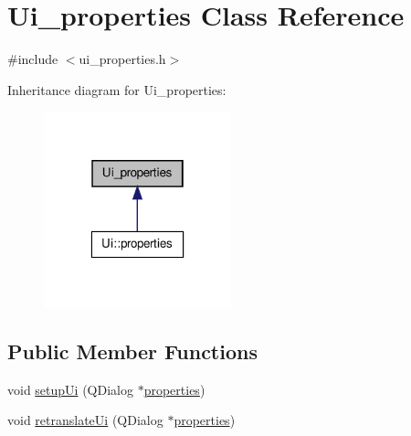 \hypertarget{classUi__properties}{
\section{Ui\_\-properties Class Reference}
\label{classUi__properties}
}


{\ttfamily \#include $<$ui\_\-properties.h$>$}



Inheritance diagram for Ui\_\-properties:
\nopagebreak
\begin{figure}[H]
\begin{center}
\leavevmode
\includegraphics[width=154pt]{classUi__properties__inherit__graph}
\end{center}
\end{figure}
\subsection*{Public Member Functions}
\begin{DoxyCompactItemize}
\item 
void \hyperlink{classUi__properties_a03ce4f30d999c6f436cfcba2c71153f5}{setupUi} (QDialog $\ast$\hyperlink{classproperties}{properties})
\item 
void \hyperlink{classUi__properties_ac1d56e369ffb4df607eb2ad3d9598e92}{retranslateUi} (QDialog $\ast$\hyperlink{classproperties}{properties})
\end{DoxyCompactItemize}
